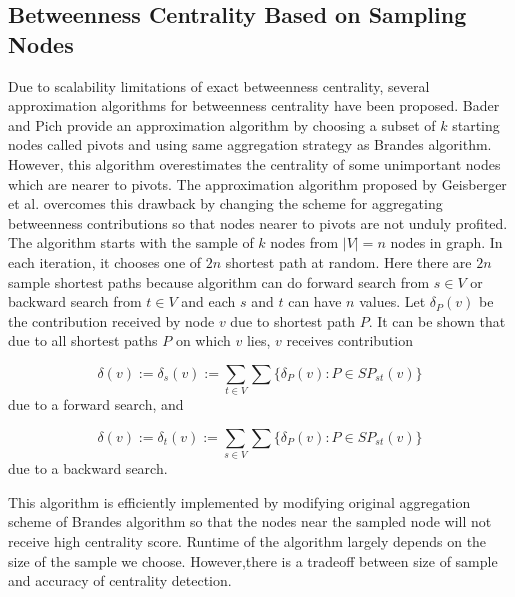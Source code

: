 \documentclass[runningheads,a4paper]{llncs}
\begin{document}
\subsection*{Betweenness Centrality Based on Sampling Nodes}
Due to scalability limitations of exact betweenness centrality, several approximation algorithms for betweenness centrality have been proposed. Bader and Pich\cite{bp} provide an approximation algorithm by choosing a subset of $k$ starting nodes called pivots and using same aggregation strategy as Brandes algorithm. However, this algorithm overestimates the centrality of some unimportant nodes which are nearer to pivots. The approximation algorithm proposed by Geisberger et al. \cite{sanders} overcomes this drawback by changing the scheme for aggregating betweenness contributions so that nodes nearer to pivots are not unduly profited. The algorithm starts with the sample of $k$ nodes from $|V| = n$ nodes in graph. In each iteration, it chooses one of $2n$ shortest path at random. Here there are $2n$ sample shortest paths because algorithm can do forward search from $s \in V$ or backward search from $t \in V$ and each $s$ and $t$ can have $n$ values. Let $\delta_{P}(v)$ be the contribution received by node $v$ due to shortest path $P$. It can be shown that \cite{sanders} due to all shortest paths $P$ on which $v$ lies, $v$ receives contribution 

$$\delta(v) := \delta_{s}(v) := \sum_{t \in V}\sum \{\delta_{P}(v):  P \in SP_{st}(v)\}$$
due to a forward search, and 

$$\delta(v) := \delta_{t}(v) := \sum_{s \in V}\sum \{\delta_{P}(v):  P \in SP_{st}(v)\}$$
due to a backward search. 

This algorithm is efficiently implemented by modifying original aggregation scheme of Brandes algorithm so that the nodes near the sampled node will not receive high centrality score. Runtime of the algorithm largely depends on the size of the sample we choose. However,there is a tradeoff between size of sample and accuracy of centrality detection.  
\end{document}
